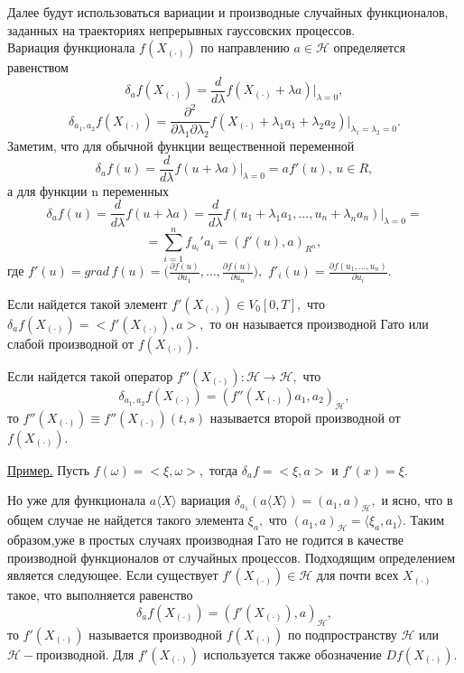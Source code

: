 \documentclass [12pt]{report}
\begin{document}
Далее будут использоваться вариации и производные случайных функционалов, заданных на
траекториях непрерывных гауссовских процессов.\\
Вариация функционала $f(X_{(\cdot)})$ по направлению $a\in\mathcal{H}$
определяется равенством
\begin{equation}\label{eq:29}
\delta_a f(X_{(\cdot)})=\frac{d}{d\lambda}f(X_{(\cdot)}+\lambda a)\Big|_{\lambda=0},
\end{equation}
$$
\delta_{a_1,a_2} f(X_{(\cdot)})=\frac{\partial^2}{\partial \lambda_1 \partial \lambda_2}f(X_{(\cdot)}+\lambda_1 a_1 + \lambda_2 a_2)\Big|_{\lambda_1 = \lambda_2 =0}.
$$
Заметим, что для обычной функции вещественной переменной
$$\delta_a f(u)=
\frac{d}{d\lambda}f(u+\lambda a)\Big|_{\lambda =0}=af'(u), \, u\in R,$$
а для функции n переменных
$$
\delta_a f(u)=\frac{d}{d\lambda}f(u+\lambda a)=
\frac{d}{d\lambda}f(u_1+\lambda_1 a_1,...,u_n+\lambda_n a_n)\Big|_{\lambda = 0}=
$$
\begin{equation}\label{eq:30}
=\sum_{i=1}^n f_{u_i}'a_i=(f'(u),a)_{R^n},
 \,
 \end{equation}
где $f'(u)=grad \, f(u)=
\Big(\frac{\partial f(u)}{\partial u_1},\ldots,
\frac{\partial f(u)}{\partial u_n}\Big),$
$f'_i(u)=\frac{\partial f(u_1,\ldots,u_n)}{\partial u_i}.$

Если найдется такой элемент $f'(X_{(\cdot)})\in V_0[0,T],$ что
$\delta_a f(X_{(\cdot)})=<f'(X_{(\cdot)}),a>,$ то он называется
производной Гато или слабой производной от $f(X_{(\cdot)}).$

Если найдется такой оператор $f''(X_{(\cdot)}): \mathcal{H} \rightarrow \mathcal{H}, $ что
$$
\delta_{a_1, a_2}f(X_{(\cdot)}) = (f''(X_{(\cdot)})a_1,a_2)_{\mathcal{H}},
$$
то $f''(X_{(\cdot)})\equiv f''(X_{(\cdot)})(t,s)$ называется второй производной от $ f(X_{(\cdot)}).$

\underline{Пример.} Пусть $f(\omega)=<\xi,\omega>,$
тогда $\delta_a f = <\xi,a>$ и $f'(x)=\xi.$

Но уже для функционала $a\langle X\rangle$ вариация
$\delta_{a_1}(a\langle X\rangle)=(a_1,a)_\mathcal{H},$
и ясно, что в общем случае не найдется такого элемента $\xi_a,$
что $(a_1,a)_\mathcal{H}=\langle \xi_a,a_1\rangle.$
Таким образом,уже в простых случаях производная Гато не годится
в качестве производной функционалов от случайных процессов.
Подходящим определением является следующее.
 Если существует $f'(X_{(\cdot)})\in\mathcal{H}$ для почти всех $X_{(\cdot)}$
такое, что выполняется равенство
 \begin{equation}\label{eq:31}
 \delta_a f(X_{(\cdot)})=(f'(X_{(\cdot)}),a)_{\mathcal{H}},
 \end{equation}
 то $f'(X_{(\cdot)})$ называется производной $f(X_{(\cdot)})$ по подпространству
 $\mathcal{H}$ или $\mathcal{H}-$производной. Для $f'(X_{(\cdot)})$ используется
 также обозначение  $Df(X_{(\cdot)}).$
\end{document}
